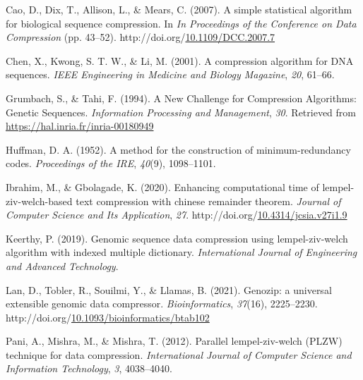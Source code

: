 \documentclass[12pt,twoside]{reedthesis}
\newlength{\cslhangindent}
\newenvironment{CSLReferences}[2] %
 {%
  \setlength{\parindent}{0pt}
  \ifodd #1 \everypar{\setlength{\hangindent}{\cslhangindent}}\ignorespaces\fi
  \ifnum #2 > 0
  \setlength{\parskip}{#2\baselineskip}
  \fi
 }%
 {}
\begin{document}
\noindent

\setlength{\parindent}{-0.20in}

\hypertarget{refs}{}
\begin{CSLReferences}{1}{0}
\leavevmode{}%
Cao, D., Dix, T., Allison, L., \& Mears, C. (2007). A simple statistical algorithm for biological sequence compression. In \emph{In Proceedings of the Conference on Data Compression} (pp. 43--52). http://doi.org/\href{https://doi.org/10.1109/DCC.2007.7}{10.1109/DCC.2007.7}

\leavevmode{}%
Chen, X., Kwong, S. T. W., \& Li, M. (2001). A compression algorithm for DNA sequences. \emph{IEEE Engineering in Medicine and Biology Magazine}, \emph{20}, 61--66.

\leavevmode{}%
Grumbach, S., \& Tahi, F. (1994). {A New Challenge for Compression Algorithms: Genetic Sequences}. \emph{{Information Processing and Management}}, \emph{30}. Retrieved from \url{https://hal.inria.fr/inria-00180949}

\leavevmode{}%
Huffman, D. A. (1952). A method for the construction of minimum-redundancy codes. \emph{Proceedings of the IRE}, \emph{40}(9), 1098--1101.

\leavevmode{}%
Ibrahim, M., \& Gbolagade, K. (2020). Enhancing computational time of lempel-ziv-welch-based text compression with chinese remainder theorem. \emph{Journal of Computer Science and Its Application}, \emph{27}. http://doi.org/\href{https://doi.org/10.4314/jcsia.v27i1.9}{10.4314/jcsia.v27i1.9}

\leavevmode{}%
Keerthy, P. (2019). Genomic sequence data compression using lempel-ziv-welch algorithm with indexed multiple dictionary. \emph{International Journal of Engineering and Advanced Technology}.

\leavevmode{}%
Lan, D., Tobler, R., Souilmi, Y., \& Llamas, B. (2021). {Genozip: a universal extensible genomic data compressor}. \emph{Bioinformatics}, \emph{37}(16), 2225--2230. http://doi.org/\href{https://doi.org/10.1093/bioinformatics/btab102}{10.1093/bioinformatics/btab102}

\leavevmode{}%
Pani, A., Mishra, M., \& Mishra, T. (2012). Parallel lempel-ziv-welch (PLZW) technique for data compression. \emph{International Journal of Computer Science and Information Technology}, \emph{3}, 4038--4040.


\end{CSLReferences}
\end{document}
